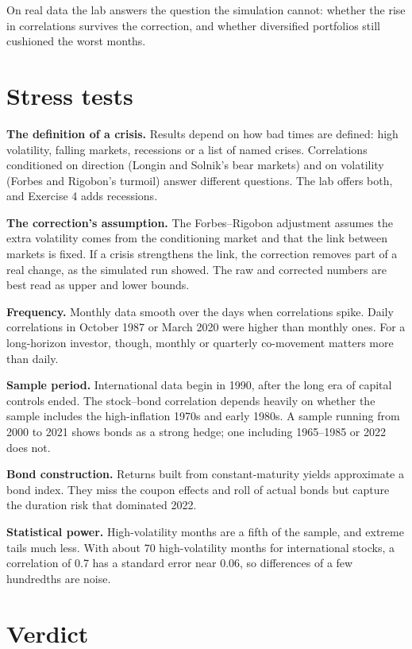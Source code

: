 On real data the lab answers the question the simulation cannot: whether the rise in correlations survives the correction, and whether diversified portfolios still cushioned the worst months.

\section{Stress tests}
\label{sec:20-stress}

\textbf{The definition of a crisis.} Results depend on how bad times are defined: high volatility, falling markets, recessions or a list of named crises. Correlations conditioned on direction (Longin and Solnik's bear markets) and on volatility (Forbes and Rigobon's turmoil) answer different questions. The lab offers both, and Exercise 4 adds recessions.

\textbf{The correction's assumption.} The Forbes--Rigobon adjustment assumes the extra volatility comes from the conditioning market and that the link between markets is fixed. If a crisis strengthens the link, the correction removes part of a real change, as the simulated run showed. The raw and corrected numbers are best read as upper and lower bounds.

\textbf{Frequency.} Monthly data smooth over the days when correlations spike. Daily correlations in October 1987 or March 2020 were higher than monthly ones. For a long-horizon investor, though, monthly or quarterly co-movement matters more than daily.

\textbf{Sample period.} International data begin in 1990, after the long era of capital controls ended. The stock--bond correlation depends heavily on whether the sample includes the high-inflation 1970s and early 1980s. A sample running from 2000 to 2021 shows bonds as a strong hedge; one including 1965--1985 or 2022 does not.

\textbf{Bond construction.} Returns built from constant-maturity yields approximate a bond index. They miss the coupon effects and roll of actual bonds but capture the duration risk that dominated 2022.

\textbf{Statistical power.} High-volatility months are a fifth of the sample, and extreme tails much less. With about 70 high-volatility months for international stocks, a correlation of 0.7 has a standard error near 0.06, so differences of a few hundredths are noise.

\section{Verdict}
\label{sec:20-verdict}

